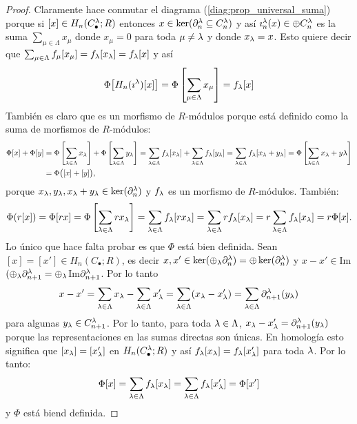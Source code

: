 \begin{proof}
  Claramente hace conmutar el diagrama (\ref{diag:prop_universal_suma}) porque si $[x]\in H_n(C_{\bullet}^{\lambda};R)$
  entonces $x\in \ker(\partial_n^{\lambda}\subseteq C_n^{\lambda})$ y as\'i $\imath^{\lambda}_n(x)\in\oplus C_n^{\lambda}$ es
  la suma $\sum_{\mu\in\Lambda} x_{\mu}$ donde $x_{\mu}=0$ para toda $\mu\neq\lambda$ y donde $x_{\lambda}=x$. Esto quiere
  decir que $\sum_{\mu\in\Lambda}f_{\mu}[x_{\mu}]=f_{\lambda}[x_{\lambda}]=f_{\lambda}[x]$ y as\'i
  \[
    \Phi\big[H_n(\imath^{\lambda})[x]\big]=\Phi\left[ \sum_{\mu\in\Lambda}x_{\mu} \right]=f_{\lambda}[x]
  \]
  Tambi\'en es claro que es un morfismo de $R$-m\'odulos porque est\'a definido como la suma de morfismos de
  $R$-m\'odulos:
  \begin{align*}
    \Phi[x]+\Phi[y]&=\Phi\left[\sum_{\lambda\in\Lambda}x_{\lambda}\right]+\Phi\left[\sum_{\lambda\in\Lambda} y_{\lambda}\right]=
    \sum_{\lambda\in\Lambda}f_{\lambda}[x_{\lambda}]+\sum_{\lambda\in\Lambda}f_{\lambda}[y_{\lambda}]=
    \sum_{\lambda\in\Lambda}f_{\lambda}[x_{\lambda}+y_{\lambda}]=
    \Phi\left[ \sum_{\lambda\in\Lambda} x_{\lambda}+y{\lambda} \right]\\ &=
    \Phi\big([x]+[y]\big),
  \end{align*}
  porque $x_{\lambda},y_{\lambda},x_{\lambda}+y_{\lambda}\in \ker(\partial_n^{\lambda})$ y $f_{\lambda}$ es un morfismo de $R$-m\'odulos.
  Tambi\'en:
  \[
    \Phi(r[x])=\Phi[rx]=\Phi\left[\sum_{\lambda\in\Lambda}r x_{\lambda}\right]=\sum_{\lambda\in\Lambda} f_{\lambda}[rx_{\lambda}]=
    \sum_{\lambda\in\Lambda} r f_{\lambda}[x_{\lambda}]=
    r\sum_{\lambda\in\Lambda} f_{\lambda}[x_{\lambda}]=r \Phi[x].
  \]
  Lo \'unico que hace falta probar es que $\Phi$ est\'a bien definida. Sean $[x]=[x']\in H_n(C_{\bullet};R)$,
  es decir $x,x'\in\ker(\oplus_{\lambda}\partial_n^{\lambda})=\oplus\ker(\partial_n^{\lambda})$ y
  $x-x'\in$Im$(\oplus_{\lambda}\partial_{n+1}^{\lambda}=\oplus_{\lambda}$Im$\partial_{n+1}^{\lambda}$. Por lo tanto
  \[
    x-x'=
    \sum_{\lambda\in\Lambda}x_{\lambda}-\sum_{\lambda\in\Lambda}x'_{\lambda}=
    \sum_{\lambda\in\Lambda}(x_{\lambda}-x'_{\lambda})=
    \sum_{\lambda\in\Lambda}\partial_{n+1}^{\lambda}(y_{\lambda})
  \]
  para algunas $y_{\lambda}\in C_{n+1}^{\lambda}$. Por lo tanto, para toda $\lambda\in\Lambda$, $x_{\lambda}-x'_{\lambda}=\partial_{n+1}^{\lambda}(y_{\lambda})$
  porque las representaciones en las sumas directas son \'unicas. En homolog\'ia esto significa que
  $[x_{\lambda}]=[x'_{\lambda}]$ en $H_n(C_{\bullet}^{\lambda};R)$ y as\'i $f_{\lambda}[x_{\lambda}]=f_{\lambda}[x'_{\lambda}]$ para toda $\lambda$. Por
  lo tanto:
  \[
    \Phi[x]=\sum_{\lambda\in\Lambda}f_{\lambda}[x_{\lambda}]=\sum_{\lambda\in\Lambda}f_{\lambda}[x'_{\lambda}]=\Phi[x']
  \]
  y $\Phi$ est\'a biend definida.
\end{proof}%

